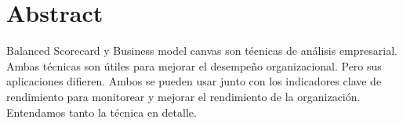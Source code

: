 \section{Abstract}

Balanced Scorecard y Business model canvas son técnicas de análisis empresarial. Ambas técnicas son útiles para mejorar el desempeño organizacional. Pero sus aplicaciones difieren. Ambos se pueden usar junto con los indicadores clave de rendimiento para monitorear y mejorar el rendimiento de la organización. Entendamos tanto la técnica en detalle.